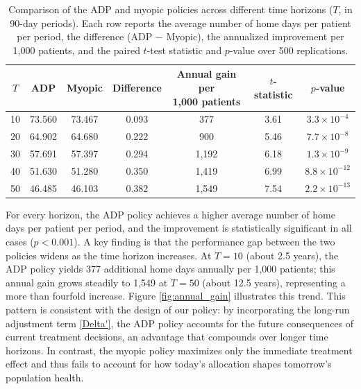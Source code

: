 \documentclass[12pt,a4paper]{article}
\begin{document}
\begin{table}[h!]
\centering
\caption{Comparison of the ADP and myopic policies across different time horizons ($T$, in 90-day periods). Each row reports the average number of home days per patient per period, the difference (ADP $-$ Myopic), the annualized improvement per 1,000 patients, and the paired $t$-test statistic and $p$-value over 500 replications.\label{tab:results}}
\begin{tabular}{ccccccc}
\hline
$T$ & ADP & Myopic & Difference & \makecell{Annual gain per \\ 1,000 patients} & $t$-statistic & $p$-value \\
\hline
10 & 73.560 & 73.467 & 0.093 & 377 & 3.61 & $3.3 \times 10^{-4}$ \\
20 & 64.902 & 64.680 & 0.222 & 900 & 5.46 & $7.7 \times 10^{-8}$ \\
30 & 57.691 & 57.397 & 0.294 & 1{,}192 & 6.18 & $1.3 \times 10^{-9}$ \\
40 & 51.630 & 51.280 & 0.350 & 1{,}419 & 6.99 & $8.8 \times 10^{-12}$ \\
50 & 46.485 & 46.103 & 0.382 & 1{,}549 & 7.54 & $2.2 \times 10^{-13}$ \\
\hline
\end{tabular}
\end{table}

For every horizon, the ADP policy achieves a higher average number of home days per patient per period, and the improvement is statistically significant in all cases ($p < 0.001$).
A key finding is that the performance gap between the two policies widens as the time horizon increases. At $T=10$ (about 2.5 years), the ADP policy yields 377 additional home days annually per 1,000 patients; this annual gain grows steadily to 1,549 at $T=50$ (about 12.5 years), representing a more than fourfold increase. Figure \ref{fig:annual_gain} illustrates this trend. This pattern is consistent with the design of our policy: by incorporating the long-run adjustment term \eqref{Delta'}, the ADP policy accounts for the future consequences of current treatment decisions, an advantage that compounds over longer time horizons. In contrast, the myopic policy maximizes only the immediate treatment effect and thus fails to account for how today's allocation shapes tomorrow's population health.
\end{document}
